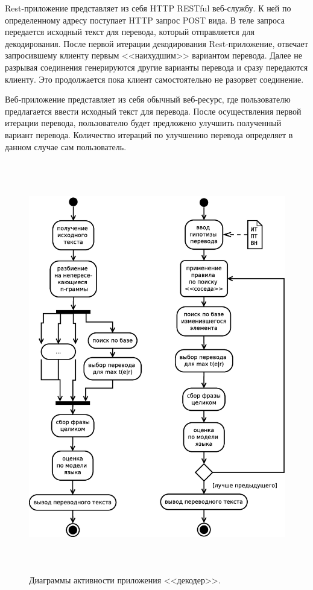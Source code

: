 Rest-приложение представляет из себя HTTP RESTful веб-службу.
К ней по определенному адресу поступает HTTP запрос POST вида.
В теле запроса передается исходный текст для перевода,
который отправляется для декодирования.
После первой итерации декодирования Rest-приложение, 
отвечает запросившему клиенту первым <<наихудшим>> вариантом перевода.
Далее не разрывая соединения генерируются другие варианты перевода
и сразу передаются клиенту. Это продолжается пока клиент 
самостоятельно не разорвет соединение.

Веб-приложение представляет из себя обычный веб-ресурс,
где пользователю предлагается ввести исходный текст для перевода.
После осуществления первой итерации перевода, пользователю
будет предложено улучшить полученный вариант перевода.
Количество итераций по улучшению перевода определяет 
в данном случае сам пользователь.


\begin{figure}[H]
	\begin{center}
		\includegraphics[height=18.0cm]{./vec/arch-decoder.eps}
	\end{center}
	\caption{Диаграммы активности приложения <<декодер>>.}
\end{figure}


\pagebreak

